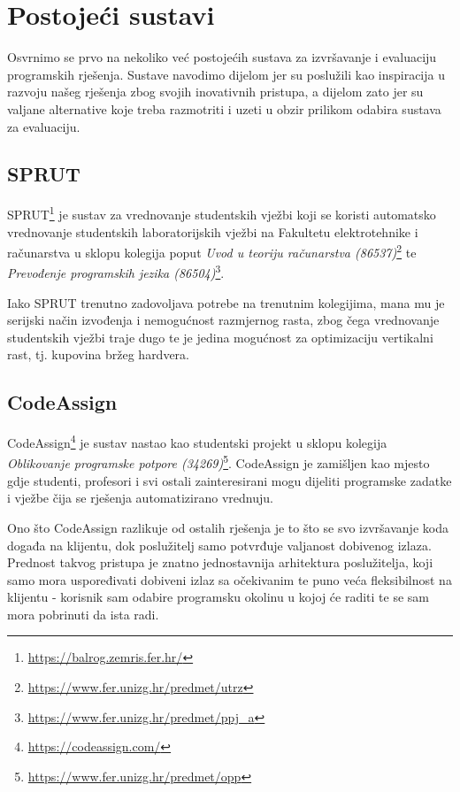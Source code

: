\documentclass[times, utf8, zavrsni]{fer}
\begin{document}

\chapter{Postojeći sustavi}

Osvrnimo se prvo na nekoliko već postojećih sustava za izvršavanje i evaluaciju programskih rješenja. Sustave navodimo dijelom jer su poslužili kao inspiracija u razvoju našeg rješenja zbog svojih inovativnih pristupa, a dijelom zato jer su valjane alternative koje treba razmotriti i uzeti u obzir prilikom odabira sustava za evaluaciju.

\section{SPRUT}

SPRUT{\footnote{\url{https://balrog.zemris.fer.hr/}}} je sustav za vrednovanje studentskih vježbi koji se koristi automatsko vrednovanje studentskih laboratorijskih vježbi na Fakultetu elektrotehnike i računarstva u sklopu kolegija poput {\textit{Uvod u teoriju računarstva (86537)}}{\footnote{\url{https://www.fer.unizg.hr/predmet/utrz}}} te {\textit{Prevođenje programskih jezika (86504)}}{\footnote{\url{https://www.fer.unizg.hr/predmet/ppj_a}}}.

Iako SPRUT trenutno zadovoljava potrebe na trenutnim kolegijima, mana mu je serijski način izvođenja i nemogućnost razmjernog rasta, zbog čega vrednovanje studentskih vježbi traje dugo te je jedina mogućnost za optimizaciju vertikalni rast, tj. kupovina bržeg hardvera.

\section{CodeAssign}

CodeAssign{\footnote{\url{https://codeassign.com/}}} je sustav nastao kao studentski projekt u sklopu kolegija {\textit{Oblikovanje programske potpore (34269)}}{\footnote{\url{https://www.fer.unizg.hr/predmet/opp}}}. CodeAssign je zamišljen kao mjesto gdje studenti, profesori i svi ostali zainteresirani mogu dijeliti programske zadatke i vježbe čija se rješenja automatizirano vrednuju.

Ono što CodeAssign razlikuje od ostalih rješenja je to što se svo izvršavanje koda događa na klijentu, dok poslužitelj samo potvrđuje valjanost dobivenog izlaza. Prednost takvog pristupa je znatno jednostavnija arhitektura poslužitelja, koji samo mora uspoređivati dobiveni izlaz sa očekivanim te puno veća fleksibilnost na klijentu - korisnik sam odabire programsku okolinu u kojoj će raditi te se sam mora pobrinuti da ista radi.
\end{document}
